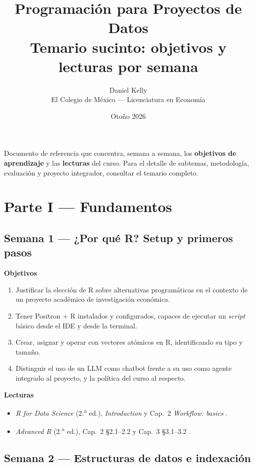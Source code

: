 \documentclass[11pt,letterpaper]{article}
\title{\color{main}\textbf{Programación para Proyectos de Datos}\\[0.3em]
       \large\color{subtitle}Temario sucinto: objetivos y lecturas por semana}
\author{Daniel Kelly\\
        \small El Colegio de México --- Licenciatura en Economía}
\date{Otoño 2026}
\newcommand{\semanaSucinta}[2]{%
  \subsection*{\color{main}Semana #1 --- #2}%
}
\begin{document}
\maketitle

\noindent\small Documento de referencia que concentra, semana a semana, los \textbf{objetivos de aprendizaje} y las \textbf{lecturas} del curso. Para el detalle de subtemas, metodología, evaluación y proyecto integrador, consultar el temario completo.

\bigskip

\section*{\color{main}Parte I --- Fundamentos}

\semanaSucinta{1}{¿Por qué R? Setup y primeros pasos}

\noindent\textbf{Objetivos}
\begin{enumerate}[leftmargin=*, itemsep=1pt]
    \item Justificar la elección de R sobre alternativas programáticas en el contexto de un proyecto académico de investigación económica.
    \item Tener Positron + R instalados y configurados, capaces de ejecutar un \textit{script} básico desde el IDE y desde la terminal.
    \item Crear, asignar y operar con vectores atómicos en R, identificando su tipo y tamaño.
    \item Distinguir el uso de un LLM como chatbot frente a su uso como agente integrado al proyecto, y la política del curso al respecto.
\end{enumerate}

\noindent\textbf{Lecturas}
\begin{itemize}[leftmargin=*, itemsep=1pt]
    \item \textit{R for Data Science} (2.\textsuperscript{a} ed.), \textit{Introduction} y Cap.\ 2 \textit{Workflow: basics} \cite{wickham2023r4ds}.
    \item \textit{Advanced R} (2.\textsuperscript{a} ed.), Cap.\ 2 §2.1--2.2 y Cap.\ 3 §3.1--3.2 \cite{wickham2019advr}.
\end{itemize}

\semanaSucinta{2}{Estructuras de datos e indexación}
\end{document}
